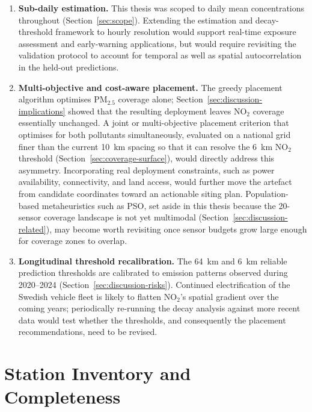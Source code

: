 \documentclass[11pt,a4paper]{article}
\let\oldsection\section
\renewcommand{\section}{\FloatBarrier\oldsection}
\begin{document}
\begin{enumerate}
    \item \textbf{Sub-daily estimation.} This thesis was scoped to daily mean concentrations throughout (Section~\ref{sec:scope}). Extending the estimation and decay-threshold framework to hourly resolution would support real-time exposure assessment and early-warning applications, but would require revisiting the validation protocol to account for temporal as well as spatial autocorrelation in the held-out predictions.
    \item \textbf{Multi-objective and cost-aware placement.} The greedy placement algorithm optimises PM$_{2.5}$ coverage alone; Section~\ref{sec:discussion-implications} showed that the resulting deployment leaves NO$_2$ coverage essentially unchanged. A joint or multi-objective placement criterion that optimises for both pollutants simultaneously, evaluated on a national grid finer than the current 10~km spacing so that it can resolve the 6~km NO$_2$ threshold (Section~\ref{sec:coverage-surface}), would directly address this asymmetry. Incorporating real deployment constraints, such as power availability, connectivity, and land access, would further move the artefact from candidate coordinates toward an actionable siting plan. Population-based metaheuristics such as PSO, set aside in this thesis because the 20-sensor coverage landscape is not yet multimodal (Section~\ref{sec:discussion-related}), may become worth revisiting once sensor budgets grow large enough for coverage zones to overlap.
    \item \textbf{Longitudinal threshold recalibration.} The 64~km and 6~km reliable prediction thresholds are calibrated to emission patterns observed during 2020--2024 (Section~\ref{sec:discussion-risks}). Continued electrification of the Swedish vehicle fleet is likely to flatten NO$_2$'s spatial gradient over the coming years; periodically re-running the decay analysis against more recent data would test whether the thresholds, and consequently the placement recommendations, need to be revised.
\end{enumerate}

\clearpage



\clearpage
\appendix

\section{Station Inventory and Completeness}
\label{app:station-inventory}
\end{document}
